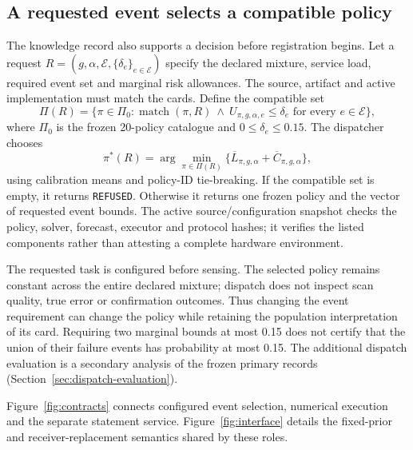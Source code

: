 \subsection{A requested event selects a compatible policy}\label{sec:dispatch}
The knowledge record also supports a decision before registration begins. Let a request $R=(g,\alpha,\mathcal E,\{\delta_e\}_{e\in\mathcal E})$ specify the declared mixture, service load, required event set and marginal risk allowances. The source, artifact and active implementation must match the cards. Define the compatible set
\begin{equation}
\Pi(R)=\{\pi\in\Pi_0:\operatorname{match}(\pi,R)\ \land\ U_{\pi,g,\alpha,e}\le\delta_e\text{ for every }e\in\mathcal E\},\label{eq:dispatch-set}
\end{equation}
where $\Pi_0$ is the frozen 20-policy catalogue and $0\le\delta_e\le0.15$. The dispatcher chooses
\begin{equation}
\pi^*(R)=\arg\min_{\pi\in\Pi(R)}\{\overline L_{\pi,g,\alpha}+\overline C_{\pi,g,\alpha}\},\label{eq:dispatch-choice}
\end{equation}
using calibration means and policy-ID tie-breaking. If the compatible set is empty, it returns \texttt{REFUSED}. Otherwise it returns one frozen policy and the vector of requested event bounds. The active source/configuration snapshot checks the policy, solver, forecast, executor and protocol hashes; it verifies the listed components rather than attesting a complete hardware environment.

The requested task is configured before sensing. The selected policy remains constant across the entire declared mixture; dispatch does not inspect scan quality, true error or confirmation outcomes. Thus changing the event requirement can change the policy while retaining the population interpretation of its card. Requiring two marginal bounds at most 0.15 does not certify that the union of their failure events has probability at most 0.15. The additional dispatch evaluation is a secondary analysis of the frozen primary records (Section~\ref{sec:dispatch-evaluation}).

Figure~\ref{fig:contracts} connects configured event selection, numerical execution and the separate statement service. Figure~\ref{fig:interface} details the fixed-prior and receiver-replacement semantics shared by these roles.
